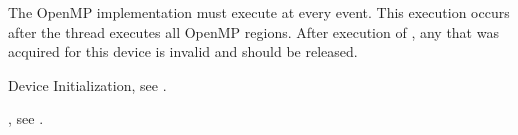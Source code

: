 \descr
The OpenMP implementation must execute  
at every  event. This execution occurs after 
the thread executes all OpenMP regions. After execution of 
, any  that 
was acquired for this device is invalid and should be released.

\begin{crossrefs}
\item Device Initialization, see .

\item {}, 
see .
\end{crossrefs}

